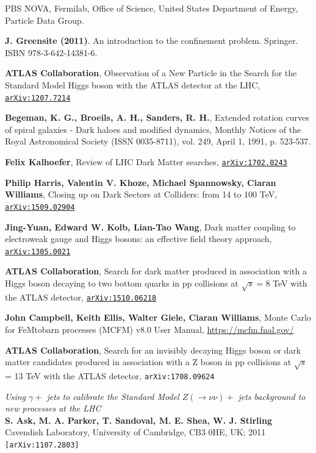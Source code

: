\documentclass[11pt,a4paper,openright,twoside]{report}
\begin{document}
\begin{thebibliography}{9}
	PBS NOVA, Fermilab, Office of Science, United States Department of Energy, Particle Data Group.

\textbf{J. Greensite (2011)}. An introduction to the confinement problem. Springer. ISBN 978-3-642-14381-6.

	\textbf{ATLAS Collaboration}, Observation of a New Particle in the Search for the Standard Model Higgs boson with the ATLAS detector at the LHC, \href{https://arxiv.org/pdf/1207.7214.pdf}{\texttt{arXiv:1207.7214}}

	\textbf{Begeman, K. G., Broeils, A. H., Sanders, R. H.}, Extended rotation curves of spiral galaxies - Dark haloes and modified dynamics, Monthly Notices of the Royal Astronomical Society (ISSN 0035-8711), vol. 249, April 1, 1991, p. 523-537.
	
\textbf{Felix Kalhoefer}, Review of LHC Dark Matter searches, \href{https://arxiv.org/pdf/1702.02430.pdf}{\texttt{arXiv:1702.0243}}

\textbf{Philip Harris, Valentin V. Khoze, Michael Spannowsky, Ciaran Williams}, Closing up on Dark Sectors at Colliders: from 14 to 100 TeV, \href{https://arxiv.org/abs/1509.02904}{\texttt{arXiv:1509.02904}}

\textbf{Jing-Yuan, Edward W. Kolb, Lian-Tao Wang}, Dark matter coupling to electroweak gauge and Higgs bosons: an effective field theory approach, \href{https://arxiv.org/pdf/1305.0021}{\texttt{arXiv:1305.0021}}

\textbf{ATLAS Collaboration}, Search for dark matter produced in association with a Higgs boson decaying to two bottom quarks in pp collisions at $\sqrt{s} = 8$ TeV with the ATLAS detector, \href{https://arxiv.org/pdf/1510.06218}{\texttt{arXiv:1510.06218}}

\textbf{John Campbell, Keith Ellis, Walter Giele, Ciaran Williams},	Monte Carlo for FeMtobarn processes (MCFM) v8.0 User Manual, \url{https://mcfm.fnal.gov/}

	\textbf{ATLAS Collaboration}, Search for an invisibly decaying Higgs boson or dark matter candidates produced in association with a Z boson in pp collisions at $\sqrt{s}$ = 13 TeV with the ATLAS detector, \texttt{arXiv:1708.09624}
	

	\textit{Using $\gamma +$ jets to calibrate the Standard Model $Z(\rightarrow \nu\nu)+$ jets background to new processes at the LHC}\\
	\textbf{S. Ask, M. A. Parker, T. Sandoval, M. E. Shea, W. J. Stirling}\\
Cavendish Laboratory, University of Cambridge, CB3 0HE, UK; 2011\\
	\texttt{[arXiv:1107.2803]}


\end{thebibliography}
\end{document}
